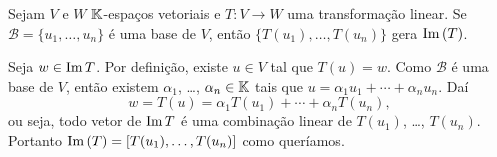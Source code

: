 \begin{lema}\label{transformacao_gera_imagem}
  Sejam $V$ e $W$ $\mathbb{K}$-espaços vetoriais e $T \colon V \to W$ uma transformação linear. Se $\mathcal{B} = \{u_1, \dots, u_n\}$ é uma base de $V$, então $\{T(u_1), \dots, T(u_n)\}$ gera ${\rm Im\,}(T)$.
\end{lema}
\begin{prova}
  Seja $w \in {\rm Im\,} T$. Por definição, existe $u \in V$ tal que $T(u) = w$. Como $\mathcal{B}$ é uma base de $V$, então existem $\alpha_1$, \dots, $\alpha_n \in \mathbb{K}$ tais que $u = \alpha_1u_1 + \cdots + \alpha_nu_n$. Daí
  \[
    w = T(u) = \alpha_1T(u_1) + \cdots + \alpha_nT(u_n),
  \]
  ou seja, todo vetor de ${\rm Im\,} T$ é uma combinação linear de $T(u_1)$, \dots, $T(u_n)$. Portanto ${\rm Im\,}(T) = [T(u_1), \dots, T(u_n)]$ como queríamos.
\end{prova}

